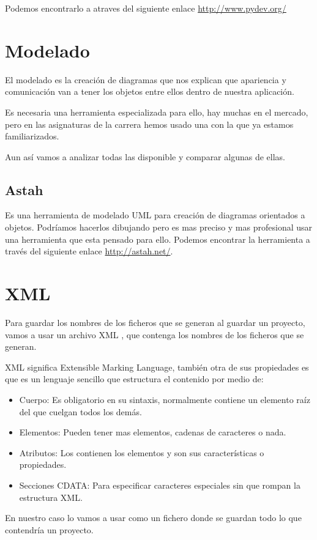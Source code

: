 Podemos encontrarlo a atraves del siguiente enlace \url{http://www.pydev.org/}

\section{Modelado}
El modelado es la creación de diagramas que nos explican que apariencia y comunicación van a tener los objetos entre ellos dentro de nuestra aplicación.

Es necesaria una herramienta especializada para ello, hay muchas en el mercado, pero en las asignaturas de la carrera hemos usado una con la que ya estamos familiarizados.

Aun así vamos a analizar todas las disponible y comparar algunas de ellas.


\subsection{Astah}
Es una herramienta de modelado UML para creación de diagramas orientados a objetos.
Podríamos hacerlos dibujando pero es mas preciso y mas profesional usar una herramienta que esta pensado para ello.
Podemos encontrar la herramienta a través del siguiente enlace  
\url{http://astah.net/}.

\section{XML}
Para guardar los nombres de los ficheros que se generan al guardar un proyecto, vamos a usar un archivo XML \cite{Wiki:xml}, que contenga los nombres de los ficheros que se generan.

XML significa Extensible Marking Language, también otra de sus propiedades es que es un lenguaje sencillo que estructura el contenido por medio de:
\begin{itemize}
\item Cuerpo: Es obligatorio en su sintaxis, normalmente contiene un elemento raíz del que cuelgan todos los demás.
\item Elementos: Pueden tener mas elementos, cadenas de caracteres o nada.
\item Atributos: Los contienen los elementos y son sus características o propiedades.
\item Secciones CDATA: Para especificar caracteres especiales sin que rompan la estructura XML.
\end{itemize}
 

En nuestro caso lo vamos a usar como un fichero donde se guardan todo lo que contendría un proyecto.
